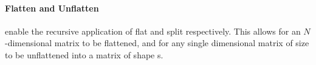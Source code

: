 \paragraph{Flatten and Unflatten} enable the recursive application of flat and 
split respectively.
This allows for an $N$-dimensional matrix to be flattened, and for any single dimensional
matrix of size  to be unflattened into a matrix of shape s.
\begin{code}%
%
\>[2]\AgdaSpace{}%
\AgdaSymbol{:}\AgdaSpace{}%
\AgdaSpace{}%
\AgdaSpace{}%
\AgdaSymbol{(}\AgdaSpace{}%
\AgdaSymbol{(}\AgdaSpace{}%
\AgdaSymbol{))}\<%
\\
%
\>[2]\AgdaSpace{}%
\AgdaSymbol{\{}\AgdaSpace{}%
%
\>[11]\AgdaSymbol{\}}\AgdaSpace{}%
\AgdaSymbol{=}\AgdaSpace{}%
\<%
\\
%
\>[2]\AgdaSpace{}%
\AgdaSymbol{\{}\AgdaSpace{}%
\AgdaSpace{}%
\AgdaSymbol{\}}\AgdaSpace{}%
\AgdaSymbol{=}\AgdaSpace{}%
\AgdaSpace{}%
\AgdaSpace{}%
\AgdaSpace{}%
\AgdaSpace{}%
\<%
\\
%
\\[\AgdaEmptyExtraSkip]%
%
\>[2]\<%
\\
%
\>[2]\AgdaSpace{}%
\AgdaSymbol{:}\AgdaSpace{}%
\AgdaSpace{}%
\AgdaSymbol{(}\AgdaSpace{}%
\AgdaSymbol{(}\AgdaSpace{}%
\AgdaSymbol{))}\AgdaSpace{}%
\<%
\\
%
\>[2]\AgdaSpace{}%
\AgdaSymbol{=}\AgdaSpace{}%
\AgdaSpace{}%
\<%
\end{code}

